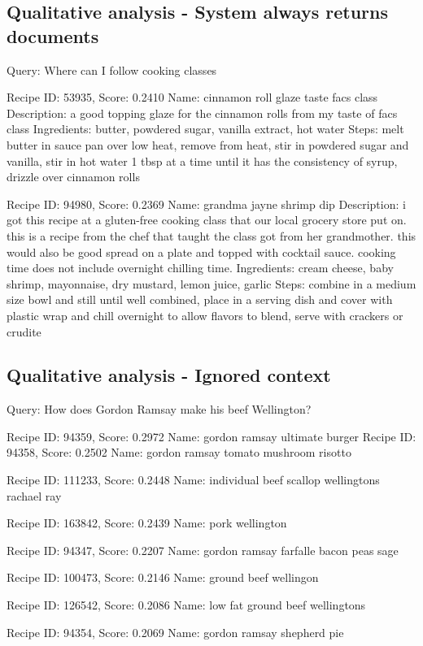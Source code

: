 \documentclass[a4paper,11pt]{article}
\begin{document}
\subsection{Qualitative analysis - System always returns documents}
Query: Where can I follow cooking classes


Recipe ID: 53935, Score: 0.2410
Name: cinnamon roll glaze taste facs class
Description: a good topping glaze for the cinnamon rolls from my taste of facs class
Ingredients: butter, powdered sugar, vanilla extract, hot water
Steps: melt butter in sauce pan over low heat, remove from heat, stir in powdered sugar and vanilla, stir in hot water 1 tbsp at a time until it has the consistency of syrup, drizzle over cinnamon rolls

Recipe ID: 94980, Score: 0.2369
Name: grandma jayne shrimp dip
Description: i got this recipe at a gluten-free cooking class that our local grocery store put on.  this is a recipe from the chef that taught the class got from her grandmother.  this would also be good spread on a plate and topped with cocktail sauce.  cooking time does not include overnight chilling time.
Ingredients: cream cheese, baby shrimp, mayonnaise, dry mustard, lemon juice, garlic
Steps: combine in a medium size bowl and still until well combined, place in a serving dish and cover with plastic wrap and chill overnight to allow flavors to blend, serve with crackers or crudite

\subsection{Qualitative analysis - Ignored context}
Query: How does Gordon Ramsay make his beef Wellington?


Recipe ID: 94359, Score: 0.2972
Name: gordon ramsay ultimate burger
Recipe ID: 94358, Score: 0.2502
Name: gordon ramsay tomato mushroom risotto

Recipe ID: 111233, Score: 0.2448
Name: individual beef scallop wellingtons rachael ray

Recipe ID: 163842, Score: 0.2439
Name: pork wellington

Recipe ID: 94347, Score: 0.2207
Name: gordon ramsay farfalle bacon peas sage

Recipe ID: 100473, Score: 0.2146
Name: ground beef wellingon

Recipe ID: 126542, Score: 0.2086
Name: low fat ground beef wellingtons

Recipe ID: 94354, Score: 0.2069
Name: gordon ramsay shepherd pie
\end{document}
